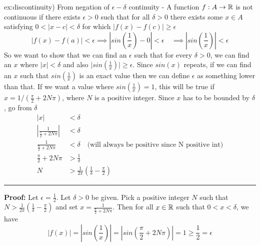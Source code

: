 \documentclass[landscape, 8pt]{extarticle}
\begin{document}
\begin{multicols}{3}
\begin{xmp}{ex:discontinuity}{)}
    From negation of $\epsilon-\delta$ continuity - A function $f:A\to\mathbb{R}$ is not continuous if there exists $\epsilon>0$ such that for all $\delta>0$ there exists some $x \in A$ satisfying $0<\lvert x-c \rvert<\delta$ for which $\lvert  f(x)-f(c) \rvert\ge \epsilon$
    \[\lvert f(x) - f(a)\rvert < \epsilon \implies \left\lvert sin\left(\frac{1}{x}\right) - 0 \right\rvert < \epsilon \quad \implies \left\lvert sin\left(\frac{1}{x}\right)\right\rvert < \epsilon\]
    So we want to show that we can find an $\epsilon$ such that for every $\delta > 0$, we can find an $x$ where $\lvert x\rvert < \delta$ and also $\lvert sin(\frac{1}{x})\rvert \ge \epsilon$.
    \vspace{0pt}\newline
    Since $sin(x)$ repeats, if we can find an $x$ such that $sin(\frac{1}{x})$ is an exact value then we can define $\epsilon$ as something lower than that. If we want a value where $sin(\frac{1}{x}) = 1$, this will be true if $x = 1 / (\frac{\pi}{2} + 2N\pi)$, where $N$ is a positive integer.
    \vspace{0pt}\newline
    Since $x$ has to be bounded by $\delta$, go from $\delta$
    \[\begin{aligned}
        \lvert x\rvert  &< \delta\\
        \left\lvert \frac{1}{\frac{\pi}{2}+2N\pi}\right\rvert &< \delta\\
        \frac{1}{\frac{\pi}{2}+2N\pi} &< \delta \quad \text{(will always be positive since N positive int)}\\ 
        \frac{\pi}{2}+2N\pi &> \frac{1}{\delta}\\
        N &> \frac{1}{2\pi}\left( \frac{1}{\delta} - \frac{\pi}{2} \right)
    \end{aligned}\]
    \vspace{3pt}
    \hrule
    \vspace{3pt}
    \noindent\textbf{Proof:} Let $\epsilon = \frac{1}{2}$. Let $\delta > 0$ be given. Pick a positive integer $N$ such that $N > \frac{1}{2\pi}\left( \frac{1}{\delta} - \frac{\pi}{2} \right)$ and set $x = \frac{1}{\frac{\pi}{2} + 2N\pi}$. Then for all $x\in \mathbb{R}$ such that $0 < x < \delta$, we have
    \[\lvert f(x)\rvert = \left\lvert sin\left(\frac{1}{x}\right) \right\rvert = \left\lvert sin\left(\frac{\pi}{2} + 2N\pi\right) \right\rvert = 1 \ge \frac{1}{2} = \epsilon\]
\end{xmp}
\vspace{-5pt}



\end{multicols}
\end{document}
